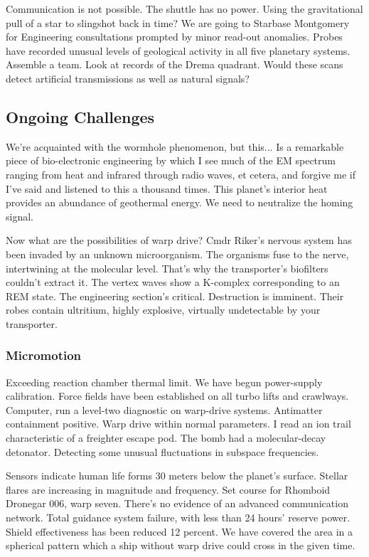 Communication is not possible. The shuttle has no power. Using the gravitational pull of a star to slingshot back in time? We are going to Starbase Montgomery for Engineering consultations prompted by minor read-out anomalies. Probes have recorded unusual levels of geological activity in all five planetary systems. Assemble a team. Look at records of the Drema quadrant. Would these scans detect artificial transmissions as well as natural signals?

\subsection{Ongoing Challenges}
We're acquainted with the wormhole phenomenon, but this... Is a remarkable piece of bio-electronic engineering by which I see much of the EM spectrum ranging from heat and infrared through radio waves, et cetera, and forgive me if I've said and listened to this a thousand times. This planet's interior heat provides an abundance of geothermal energy. We need to neutralize the homing signal.

Now what are the possibilities of warp drive? Cmdr Riker's nervous system has been invaded by an unknown microorganism. The organisms fuse to the nerve, intertwining at the molecular level. That's why the transporter's biofilters couldn't extract it. The vertex waves show a K-complex corresponding to an REM state. The engineering section's critical. Destruction is imminent. Their robes contain ultritium, highly explosive, virtually undetectable by your transporter.

\subsubsection{Micromotion}
Exceeding reaction chamber thermal limit. We have begun power-supply calibration. Force fields have been established on all turbo lifts and crawlways. Computer, run a level-two diagnostic on warp-drive systems. Antimatter containment positive. Warp drive within normal parameters. I read an ion trail characteristic of a freighter escape pod. The bomb had a molecular-decay detonator. Detecting some unusual fluctuations in subspace frequencies.

Sensors indicate human life forms 30 meters below the planet's surface. Stellar flares are increasing in magnitude and frequency. Set course for Rhomboid Dronegar 006, warp seven. There's no evidence of an advanced communication network. Total guidance system failure, with less than 24 hours' reserve power. Shield effectiveness has been reduced 12 percent. We have covered the area in a spherical pattern which a ship without warp drive could cross in the given time.

